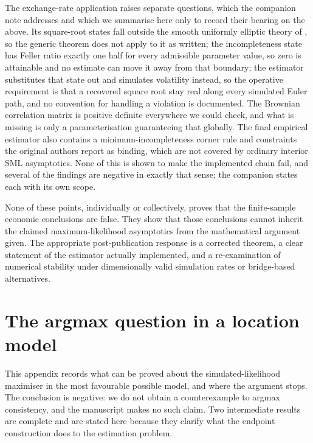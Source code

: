 \documentclass[11pt]{article}
\theoremstyle{definition}
\begin{document}
The exchange-rate application raises separate questions, which the companion note addresses and which we summarise here only to record their bearing on the above. Its square-root states fall outside the smooth uniformly elliptic theory of , so the generic theorem does not apply to it as written; the incompleteness state has Feller ratio exactly one half for every admissible parameter value, so zero is attainable and no estimate can move it away from that boundary; the estimator substitutes that state out and simulates volatility instead, so the operative requirement is that a recovered square root stay real along every simulated Euler path, and no convention for handling a violation is documented. The Brownian correlation matrix is positive definite everywhere we could check, and what is missing is only a parameterisation guaranteeing that globally. The final empirical estimator also contains a minimum-incompleteness corner rule and constraints the original authors report as binding, which are not covered by ordinary interior SML asymptotics. None of this is shown to make the implemented chain fail, and several of the findings are negative in exactly that sense; the companion states each with its own scope.

None of these points, individually or collectively, proves that the finite-sample economic conclusions are false. They show that those conclusions cannot inherit the claimed maximum-likelihood asymptotics from the mathematical argument given. The appropriate post-pub\-li\-ca\-tion response is a corrected theorem, a clear statement of the estimator actually implemented, and a re-examination of numerical stability under dimensionally valid simulation rates or bridge-based alternatives.

\appendix

\FloatBarrier
\FloatBarrier
\section{The argmax question in a location model}\label{app:argmax}

This appendix records what can be proved about the simulated-likelihood maximiser in the most favourable possible model, and where the argument stops. The conclusion is negative: we do not obtain a counterexample to argmax consistency, and the manuscript makes no such claim. Two intermediate results are complete and are stated here because they clarify what the endpoint construction does to the estimation problem.
\end{document}
